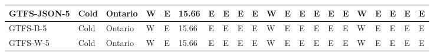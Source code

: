 \begin{table}[]
{\begin{tabular}{|c|l|l|l|l|l|l|l|l|l|l|l|l|l|l|l|l|l|l|l|l|}
\multicolumn{1}{|l|}{GTFS-JSON-5} & Cold                                & Ontario                            & W           & E           & 15.66       & E           & E           & E           & E           & W           & E           & E            & E            & E            & E            & W            & E            & E            & E            & E            \\ \hline
\multicolumn{1}{|l|}{GTFS-B-5}    & Cold                                & Ontario                            & W           & E           & 15.66       & E           & E           & E           & E           & W           & E           & E            & E            & E            & E            & W            & E            & E            & E            & E            \\ \hline
\multicolumn{1}{|l|}{GTFS-W-5}    & Cold                                & Ontario                            & W           & E           & 15.66       & E           & E           & E           & E           & W           & E           & E            & E            & E            & E            & W            & E            & E            & E            & E            \\ \hline
\end{tabular}%
}
\end{table}

